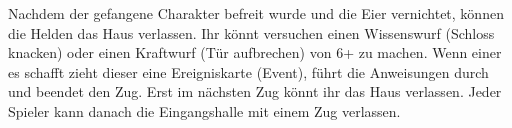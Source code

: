 
Nachdem der gefangene Charakter befreit wurde und die Eier vernichtet, können die Helden das Haus verlassen. Ihr könnt versuchen einen Wissenswurf (Schloss knacken) oder einen
Kraftwurf (Tür aufbrechen) von 6+ zu machen. Wenn einer es schafft zieht dieser eine Ereigniskarte (Event), führt die Anweisungen durch und beendet den Zug. Erst im nächsten Zug könnt ihr das Haus verlassen.
Jeder Spieler kann danach die Eingangshalle mit einem Zug verlassen.


